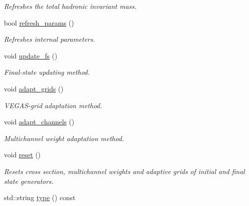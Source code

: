 \begin{DoxyCompactItemize}
\begin{DoxyCompactList}\small\item\em Refreshes the total hadronic invariant mass. \end{DoxyCompactList}\item 
\hypertarget{a00447_a0de27cdc3d77a3a73c9da779e2d04c40}{bool \hyperlink{a00447_a0de27cdc3d77a3a73c9da779e2d04c40}{refresh\-\_\-params} ()}\label{a00447_a0de27cdc3d77a3a73c9da779e2d04c40}

\begin{DoxyCompactList}\small\item\em Refreshes internal parameters. \end{DoxyCompactList}\item 
\hypertarget{a00447_a02089aae254ceb704dd7abc66407f580}{void \hyperlink{a00447_a02089aae254ceb704dd7abc66407f580}{update\-\_\-fs} ()}\label{a00447_a02089aae254ceb704dd7abc66407f580}

\begin{DoxyCompactList}\small\item\em Final-\/state updating method. \end{DoxyCompactList}\item 
\hypertarget{a00447_a560a1c8f3437b28b00f650f191f6ce21}{void \hyperlink{a00447_a560a1c8f3437b28b00f650f191f6ce21}{adapt\-\_\-grids} ()}\label{a00447_a560a1c8f3437b28b00f650f191f6ce21}

\begin{DoxyCompactList}\small\item\em V\-E\-G\-A\-S-\/grid adaptation method. \end{DoxyCompactList}\item 
\hypertarget{a00447_a81e174a16acf3240acb315522bbf6ea9}{void \hyperlink{a00447_a81e174a16acf3240acb315522bbf6ea9}{adapt\-\_\-channels} ()}\label{a00447_a81e174a16acf3240acb315522bbf6ea9}

\begin{DoxyCompactList}\small\item\em Multichannel weight adaptation method. \end{DoxyCompactList}\item 
void \hyperlink{a00447_a3abc78349f929f2cb7be411d9851a7d1}{reset} ()
\begin{DoxyCompactList}\small\item\em Resets cross section, multichannel weights and adaptive grids of initial and final state generators. \end{DoxyCompactList}\item 
\hypertarget{a00447_a84340eb426ff24e2adccb26fb30fc7c5}{std\-::string \hyperlink{a00447_a84340eb426ff24e2adccb26fb30fc7c5}{type} () const }\label{a00447_a84340eb426ff24e2adccb26fb30fc7c5}


\end{DoxyCompactItemize}
